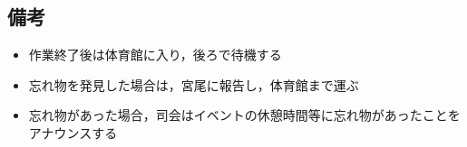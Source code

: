 \subsection{備考}
\begin{itemize}
  \item 作業終了後は体育館に入り，後ろで待機する
  \item 忘れ物を発見した場合は，宮尾に報告し，体育館まで運ぶ
  \item 忘れ物があった場合，司会はイベントの休憩時間等に忘れ物があったことをアナウンスする
\end{itemize}

%



